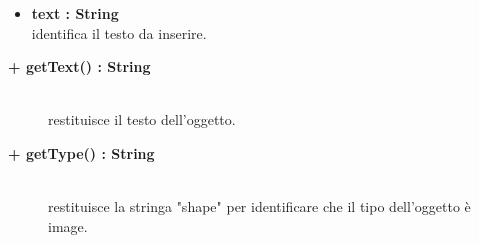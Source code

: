 \begin{description}
\begin{description}
\begin{description}
\begin{itemize}
					\item \textbf{text : String			} \hfill \\
					identifica il testo da inserire.
				\end{itemize}
		\end{description}

\end{description}

\begin{description}
		\item[\textbf{\color{blue}+ getText() : String			}] \hfill \\
			restituisce il testo dell'oggetto. 

\end{description}

\begin{description}
		\item[\textbf{\color{blue}+ getType() : String			}] \hfill \\
			restituisce la stringa "shape" per identificare che il tipo dell'oggetto è image. 

\end{description}



\end{description}










